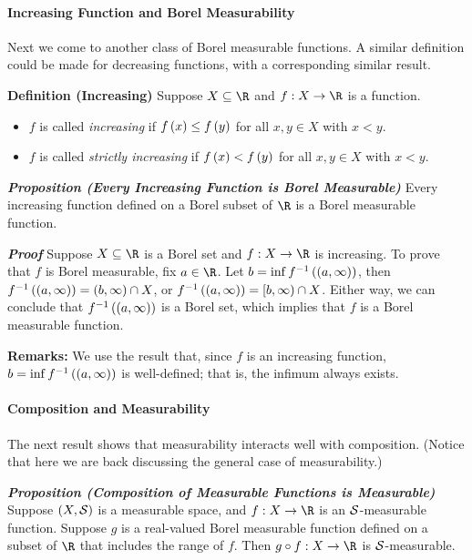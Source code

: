 \documentclass[
]{article}
\begin{document}
\hypertarget{increasing-function-and-borel-measurability}{%
\paragraph{Increasing Function and Borel
Measurability}\label{increasing-function-and-borel-measurability}}

Next we come to another class of Borel measurable functions. A similar
definition could be made for decreasing functions, with a corresponding
similar result.

\textbf{Definition (Increasing)} Suppose \(X\se \R\) and \(f:X\to \R\)
is a function.

\begin{itemize}
\item
  \(f\) is called \emph{increasing} if \(f\pr x\le f\pr y\) for all
  \(x,y\in X\) with \(x<y\).
\item
  \(f\) is called \emph{strictly increasing} if \(f\pr x<f\pr y\) for
  all \(x,y\in X\) with \(x<y\).
\end{itemize}

\emph{\textbf{Proposition (Every Increasing Function is Borel
Measurable)}} Every increasing function defined on a Borel subset of
\(\R\) is a Borel measurable function.

\emph{\textbf{Proof}} Suppose \(X\se \R\) is a Borel set and
\(f:X\to \R\) is increasing. To prove that \(f\) is Borel measurable,
fix \(a\in \R\). Let \(b = \inf\inv f\pr{\pr{a,\infty}}\), then
\(\inv f\pr{\pr{a,\infty}} = \pr{b,\infty}\cap X\), or
\(\inv f\pr{\pr{a,\infty}} = [b,\infty)\cap X\). Either way, we can
conclude that \(\inv f\pr{\pr{a,\infty}}\) is a Borel set, which implies
that \(f\) is a Borel measurable function.

\textbf{Remarks:} We use the result that, since \(f\) is an increasing
function, \(b = \inf\inv f\pr{\pr{a,\infty}}\) is well-defined; that is,
the infimum always exists.

\hypertarget{composition-and-measurability}{%
\paragraph{Composition and
Measurability}\label{composition-and-measurability}}

The next result shows that measurability interacts well with
composition. (Notice that here we are back discussing the general case
of measurability.)

\emph{\textbf{Proposition (Composition of Measurable Functions is
Measurable)}} Suppose \(\pr{X,\S}\) is a measurable space, and
\(f:X\to \R\) is an \(\S\)-measurable function. Suppose \(g\) is a
real-valued Borel measurable function defined on a subset of \(\R\) that
includes the range of \(f\). Then \(g\circ f:X\to \R\) is
\(\S\)-measurable.
\end{document}
